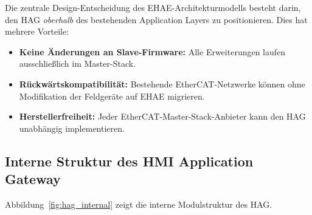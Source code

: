 ﻿\documentclass[12pt,a4paper]{article}
\begin{document}
Die zentrale Design-Entscheidung des EHAE-Architekturmodells besteht darin, den HAG
\emph{oberhalb} des bestehenden Application Layers zu positionieren. Dies hat mehrere
Vorteile:

\begin{itemize}[leftmargin=2em]
  \item \textbf{Keine Änderungen an Slave-Firmware:} Alle Erweiterungen laufen
    ausschlie\ss{}lich im Master-Stack.
  \item \textbf{Rückwärtskompatibilität:} Bestehende EtherCAT-Netzwerke können ohne
    Modifikation der Feldgeräte auf EHAE migrieren.
  \item \textbf{Herstellerfreiheit:} Jeder EtherCAT-Master-Stack-Anbieter kann den HAG
    unabhängig implementieren.
\end{itemize}

\subsection{Interne Struktur des HMI Application Gateway}

Abbildung~\ref{fig:hag_internal} zeigt die interne Modulstruktur des HAG.
\end{document}
